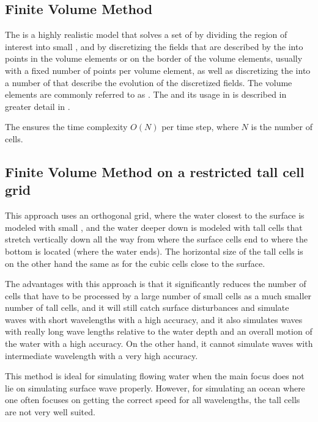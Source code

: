 \subsection{Finite Volume Method}

The \FVM is a highly realistic model that solves a set of \PDEs by dividing the region of interest into small , and by discretizing the fields that are described by the \PDEs into points in the volume elements or on the border of the volume elements, usually with a fixed number of points per volume element, as well as discretizing the \PDEs into a number of \ODEs that describe the evolution of the discretized fields. The volume elements are commonly referred to as \cells. The \FVM and its usage in \CFD is described in greater detail in .

The \FVM ensures the time complexity $O(N)$ per time step, where $N$ is the number of cells.

\subsection{Finite Volume Method on a restricted tall cell grid}

This approach \citep{Chentanez2011} uses an orthogonal grid, where the water closest to the surface is modeled with small , and the water deeper down is modeled with tall cells that stretch vertically down all the way from where the surface cells end to where the bottom is located (where the water ends). The horizontal size of the tall cells is on the other hand the same as for the cubic cells close to the surface.

The advantages with this approach is that it significantly reduces the number of cells that have to be processed by \approximating a large number of small cells as a much smaller number of tall cells, and it will still catch surface disturbances and simulate waves with short wavelengths with a high accuracy, and it also simulates waves with really long wave lengths relative to the water depth and an overall motion of the water with a high accuracy. On the other hand, it cannot simulate waves with intermediate wavelength with a very high accuracy.

This method is ideal for simulating flowing water when the main focus does not lie on simulating surface wave properly. However, for simulating an ocean where one often focuses on getting the correct speed for all wavelengths, the tall cells are not very well suited.

